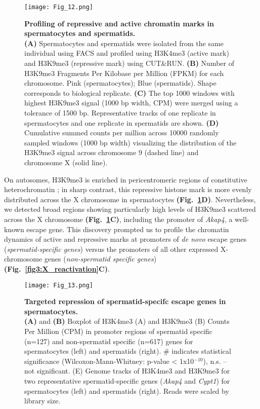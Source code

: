 \begin{figure}[!h]
\centering
\texttt{[image: Fig\_12.png]}
\caption[Chromatin profiling in spermatocytes and spermatids]{\textbf{Profiling of repressive and active chromatin marks in spermatocytes and spermatids.} \\
\textbf{(A)} Spermatocytes and spermatids were isolated from the same individual using FACS and profiled using H3K4me3 (active mark) and H3K9me3 (repressive mark) using CUT\&{}RUN. \textbf{(B)} Number of H3K9me3 Fragments Per Kilobase per Million (FPKM) for each chromosome. Pink (spermatocytes); Blue (spermatids). Shape corresponds to biological replicate. \textbf{(C)} The top 1000 windows with highest H3K9me3 signal (1000 bp width, CPM) were merged using a tolerance of 1500 bp. Representative tracks of one replicate in spermatocytes and one replicate in spermatids are shown. \textbf{(D)} Cumulative summed counts per million across 10000 randomly sampled windows (1000 bp width) visualizing the distribution of the H3K9me3 signal across chromosome 9 (dashed line) and chromosome X (solid line). 
}
\label{fig3:K9_global}
\end{figure}

On autosomes, H3K9me3 is enriched in pericentromeric regions of constitutive heterochromatin \citep{Peters2001}; in sharp contrast, this repressive histone mark is more evenly distributed across the X chromosome in spermatocytes  \textbf{(Fig.~\ref{fig3:K9_global}D)}. Nevertheless, we detected broad regions showing particularly high levels of H3K9me3 scattered across the X chromosome  \textbf{(Fig.~\ref{fig3:K9_global}C)}, including the promoter of \textit{Akap4}, a well-known escape gene. This discovery prompted us to profile the chromatin dynamics of active and repressive marks at promoters of \emph{de novo} escape genes (\emph{spermatid-specific genes}) versus the promoters of all other expressed X-chromosome genes (\emph{non-spermatid specific genes}) \textbf{(Fig.~\ref{fig3:X_reactivation}C)}.

\begin{figure}[!h]
\centering
\texttt{[image: Fig\_13.png]}
\caption[Targeted repression of spermatid-specifc escape genes in spermatocytes]{\textbf{Targeted repression of spermatid-specifc escape genes in spermatocytes.} \\
\textbf{(A)} and \textbf{(B)} Boxplot of H3K4me3 (A) and H3K9me3 (B) Counts Per Million (CPM) in promoter regions of spermatid specific (n=127) and non-spermatid specific (n=617) genes for spermatocytes (left) and spermatids (right).  \# indicates statistical significance (Wilcoxon-Mann-Whitney: p-value < 1x10$^{-10}$), n.s. – not significant. 
(E) Genome tracks of H3K4me3 and H3K9me3 for two representative spermatid-specific genes (\textit{Akap4} and \textit{Cypt1}) for spermatocytes (left) and spermatids (right). Reads were scaled by library size.}
\label{fig3:K9_K4_targeted}
\end{figure}

